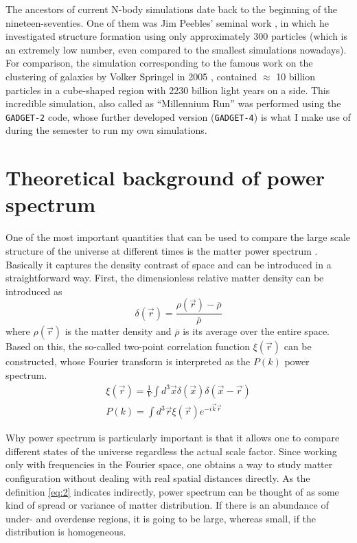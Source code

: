 \documentclass[12pt]{article}
\begin{document}
The ancestors of current N-body simulations date back to the beginning of the nineteen-seventies. One of them was Jim Peebles' seminal work \cite{Peebles1970}, in which he investigated structure formation using only approximately 300 particles (which is an extremely low number, even compared to the smallest simulations nowadays). For comparison, the simulation corresponding to the famous work on the clustering of galaxies by Volker Springel in 2005 \cite{Springel2005Nature}, contained $\approx$ 10 billion particles in a cube-shaped region with 2230 billion light years on a side. This incredible simulation, also called as ``Millennium Run'' was performed using the \texttt{GADGET-2} code, whose further developed version (\texttt{GADGET-4}) is what I make use of during the semester to run my own simulations.

\section{Theoretical background of power spectrum}
One of the most important quantities that can be used to compare the large scale structure of the universe at different times is the matter power spectrum \cite{Dodelson2020ModernCosmology}. Basically it captures the density contrast of space and can be introduced in a straightforward way.
First, the dimensionless relative matter density can be introduced as
\begin{equation}
    \delta(\vec{r})=\frac{\rho(\vec{r})-\overline{\rho}}{\overline{\rho}}
\end{equation}
where $\rho(\vec{r})$ is the matter density and $\overline{\rho}$ is its average over the entire space. Based on this, the so-called two-point correlation function $\xi(\vec{r})$ can be constructed, whose Fourier transform is interpreted as the $P(k)$ power spectrum.
\begin{equation}\label{eq:2}
\begin{split}
    \xi(\vec{r})=\frac{1}{V}\int d^3\vec{x}\delta(\vec{x})\delta(\vec{x}-\vec{r})\\P(k)=\int d^3\vec{r}\xi(\vec{r})e^{-i\vec{k}\vec{r}}\;\;\;\;
\end{split}
\end{equation}

Why power spectrum is particularly important is that it allows one to compare different states of the universe regardless the actual scale factor. Since working only with frequencies in the Fourier space, one obtains a way to study matter configuration without dealing with real spatial distances directly. As the definition \eqref{eq:2} indicates indirectly, power spectrum can be thought of as some kind of spread or variance of matter distribution. If there is an abundance of under- and overdense regions, it is going to be large, whereas small, if the distribution is homogeneous.
\end{document}
